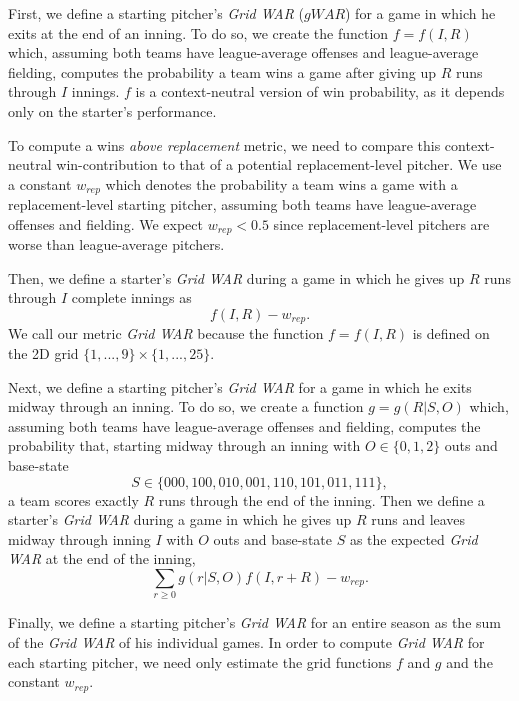 \documentclass[12pt]{article}
\begin{document}
First, we define a starting pitcher's \textit{Grid WAR} ($gWAR$) for a game in which he exits at the end of an inning. To do so, we create the function $f=f(I,R)$ which, assuming both teams have league-average offenses and league-average fielding, computes the probability a team wins a game after giving up $R$ runs through $I$ innings. $f$ is a context-neutral version of win probability, as it depends only on the starter's performance. 

To compute a wins \textit{above replacement} metric, we need to compare this context-neutral win-contribution to that of a potential replacement-level pitcher. We use a constant $w_{rep}$ which denotes the probability a team wins a game with a replacement-level starting pitcher, assuming both teams have league-average offenses and fielding. We expect $w_{rep} < 0.5$ since replacement-level pitchers are worse than league-average pitchers. 

Then, we define a starter's \textit{Grid WAR} during a game in which he gives up $R$ runs through $I$ complete innings as 
\begin{equation}
f(I, R) - w_{rep}.
\label{eqn:war_f}
\end{equation}
We call our metric \textit{Grid WAR} because the function $f=f(I,R)$ is defined on the 2D grid $\{1,...,9\} \times \{1,...,25\}$.

Next, we define a starting pitcher's \textit{Grid WAR} for a game in which he exits midway through an inning. To do so, we create a function $g=g(R|S,O)$ which, assuming both teams have league-average offenses and fielding, computes the probability that, starting midway through an inning with $O \in \{0,1,2\}$ outs and base-state 
$$S \in \{000,100,010,001,110,101,011,111\},$$
a team scores exactly $R$ runs through the end of the inning. Then we define a starter's \textit{Grid WAR} during a game in which he gives up $R$ runs and leaves midway through inning $I$ with $O$ outs and base-state $S$ as the expected \textit{Grid WAR} at the end of the inning,
\begin{equation}
\sum_{r \geq 0} g(r|S,O) f(I,r+R) - w_{rep}.
\label{eqn:war_g}
\end{equation}

Finally, we define a starting pitcher's \textit{Grid WAR} for an entire season as the sum of the \textit{Grid WAR} of his individual games. In order to compute \textit{Grid WAR} for each starting pitcher, we need only estimate the grid functions $f$ and $g$ and the constant $w_{rep}$.
\end{document}
